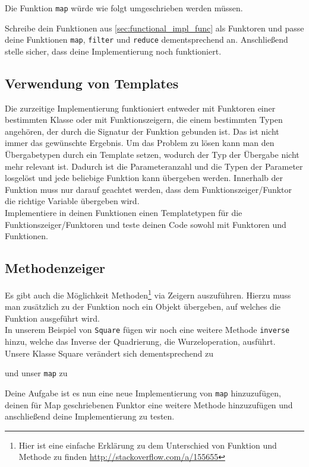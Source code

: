 Die Funktion \lstinline{map} würde wie folgt umgeschrieben werden müssen.



Schreibe dein Funktionen aus \ref{sec:functional_impl_func} als Funktoren und passe deine Funktionen \lstinline{map}, \lstinline{filter} und \lstinline{reduce} dementsprechend an.
Anschließend stelle sicher, dass deine Implementierung noch funktioniert.

\subsection{Verwendung von Templates}
\label{sec:functional_template}
Die zurzeitige Implementierung funktioniert entweder mit Funktoren einer bestimmten Klasse oder mit Funktionszeigern, die einem bestimmten Typen angehören, der durch die Signatur der Funktion gebunden ist.
Das ist nicht immer das gewünschte Ergebnis.
Um das Problem zu lösen kann man den Übergabetypen durch ein Template setzen, wodurch der Typ der Übergabe nicht mehr relevant ist.
Dadurch ist die Parameteranzahl und die Typen der Parameter losgelöst und jede beliebige Funktion kann übergeben werden.
Innerhalb der Funktion muss nur darauf geachtet werden, dass dem Funktionszeiger/Funktor die richtige Variable übergeben wird. \\

Implementiere in deinen Funktionen einen Templatetypen für die Funktionszeiger/Funktoren und teste deinen Code sowohl mit Funktoren und Funktionen.

\subsection{Methodenzeiger}
\label{sec:functional_method}
Es gibt auch die Möglichkeit Methoden\footnote{Hier ist eine einfache Erklärung zu dem Unterschied von Funktion und Methode zu finden \url{http://stackoverflow.com/a/155655}} via Zeigern auszuführen.
Hierzu muss man zusätzlich zu der Funktion noch ein Objekt übergeben, auf welches die Funktion ausgeführt wird. \\

In unserem Beispiel von \lstinline{Square} fügen wir noch eine weitere Methode \lstinline{inverse} hinzu, welche das Inverse der Quadrierung, die Wurzeloperation, ausführt. \\

Unsere Klasse Square verändert sich dementsprechend zu



und unser \lstinline{map} zu 



Deine Aufgabe ist es nun eine neue Implementierung von \lstinline{map} hinzuzufügen, deinen für Map geschriebenen Funktor eine weitere Methode hinzuzufügen und anschließend deine Implementierung zu testen.
